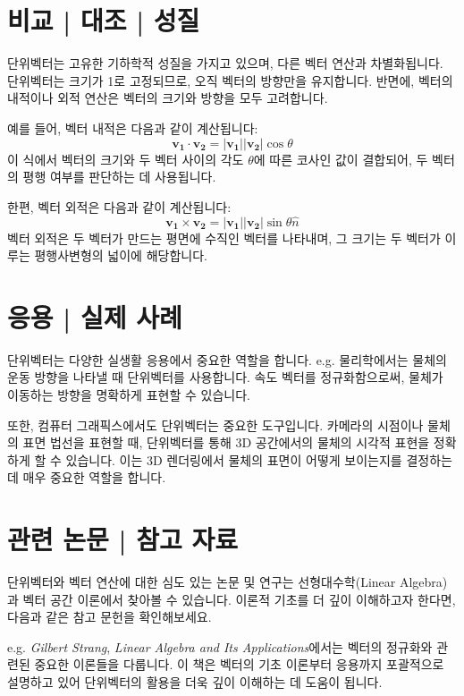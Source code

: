 \documentclass[12pt]{article}
\begin{document}
\section{비교 | 대조 | 성질}

\noindent 단위벡터는 고유한 기하학적 성질을 가지고 있으며, 다른 벡터 연산과 차별화됩니다. 단위벡터는 크기가 1로 고정되므로, 오직 벡터의 방향만을 유지합니다. 반면에, 벡터의 내적이나 외적 연산은 벡터의 크기와 방향을 모두 고려합니다.

예를 들어, 벡터 내적은 다음과 같이 계산됩니다:
\[
  \mathbf{v_1} \cdot \mathbf{v_2} = |\mathbf{v_1}| |\mathbf{v_2}| \cos{\theta}
\]
이 식에서 벡터의 크기와 두 벡터 사이의 각도 \( \theta \)에 따른 코사인 값이 결합되어, 두 벡터의 평행 여부를 판단하는 데 사용됩니다.

\noindent 한편, 벡터 외적은 다음과 같이 계산됩니다:
\[
  \mathbf{v_1} \times \mathbf{v_2} = |\mathbf{v_1}| |\mathbf{v_2}| \sin{\theta} \hat{n}
\]
벡터 외적은 두 벡터가 만드는 평면에 수직인 벡터를 나타내며, 그 크기는 두 벡터가 이루는 평행사변형의 넓이에 해당합니다.


\section{응용 | 실제 사례}

\noindent 단위벡터는 다양한 실생활 응용에서 중요한 역할을 합니다.
\vspace{1\baselineskip}
\noindent {} e.g. 물리학에서는 물체의 운동 방향을 나타낼 때 단위벡터를 사용합니다. 속도 벡터를 정규화함으로써, 물체가 이동하는 방향을 명확하게 표현할 수 있습니다.

\noindent 또한, 컴퓨터 그래픽스에서도 단위벡터는 중요한 도구입니다. 카메라의 시점이나 물체의 표면 법선을 표현할 때, 단위벡터를 통해 3D 공간에서의 물체의 시각적 표현을 정확하게 할 수 있습니다. 이는 3D 렌더링에서 물체의 표면이 어떻게 보이는지를 결정하는 데 매우 중요한 역할을 합니다.


\section{관련 논문 | 참고 자료}

\noindent 단위벡터와 벡터 연산에 대한 심도 있는 논문 및 연구는 선형대수학(Linear Algebra)과 벡터 공간 이론에서 찾아볼 수 있습니다. 이론적 기초를 더 깊이 이해하고자 한다면, 다음과 같은 참고 문헌을 확인해보세요.


\vspace{1\baselineskip}
\noindent {} e.g. \textit{Gilbert Strang}, \textit{Linear Algebra and Its Applications}에서는 벡터의 정규화와 관련된 중요한 이론들을 다룹니다. 이 책은 벡터의 기초 이론부터 응용까지 포괄적으로 설명하고 있어 단위벡터의 활용을 더욱 깊이 이해하는 데 도움이 됩니다.
\end{document}
